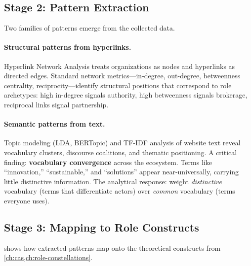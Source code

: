 \documentclass[../main.tex]{subfiles}
\begin{document}
\subsection{Stage 2: Pattern Extraction}

Two families of patterns emerge from the collected data.

\paragraph{Structural patterns from hyperlinks.}
Hyperlink Network Analysis treats organizations as nodes and hyperlinks
as directed edges.
Standard network metrics---in-degree, out-degree, betweenness
centrality, reciprocity---identify structural positions that correspond
to role archetypes:
high in-degree signals authority, high betweenness signals brokerage,
reciprocal links signal partnership.

\paragraph{Semantic patterns from text.}
Topic modeling (LDA, BERTopic) and TF-IDF analysis of website text
reveal vocabulary clusters, discourse coalitions, and thematic positioning.
A critical finding: \textbf{vocabulary convergence} across the ecosystem.
Terms like ``innovation,'' ``sustainable,'' and ``solutions'' appear
near-universally, carrying little distinctive information.
The analytical response: weight \emph{distinctive} vocabulary
(terms that differentiate actors) over \emph{common} vocabulary
(terms everyone uses).

\subsection{Stage 3: Mapping to Role Constructs}

 shows how extracted patterns map onto
the theoretical constructs from \cref{ch:cas,ch:role-constellations}.
\end{document}

